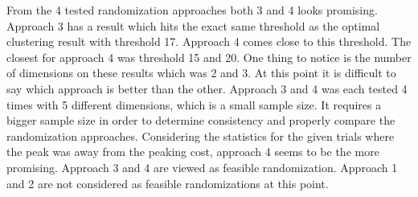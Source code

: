 \documentclass[a4paper,10pt]{article}
\theoremstyle{plain}
\theoremstyle{definition}
\begin{document}
From the 4 tested randomization approaches both 3 and 4 looks promising. Approach 3 has a result which hits the exact same threshold as the optimal clustering result with threshold 17. Approach 4 comes close to this threshold. The closest for approach 4 was threshold 15 and 20. One thing to notice is the number of dimensions on these results which was 2 and 3. At this point it is difficult to say which approach is better than the other. Approach 3 and 4 was each tested 4 times with 5 different dimensions, which is a small sample size. It requires a bigger sample size in order to determine consistency and properly compare the randomization approaches. Considering the statistics for the given trials where the peak was away from the peaking cost, approach 4 seems to be the more promising. Approach 3 and 4 are viewed as feasible randomization. Approach 1 and 2 are not considered as feasible randomizations at this point.
\\

\end{document}
